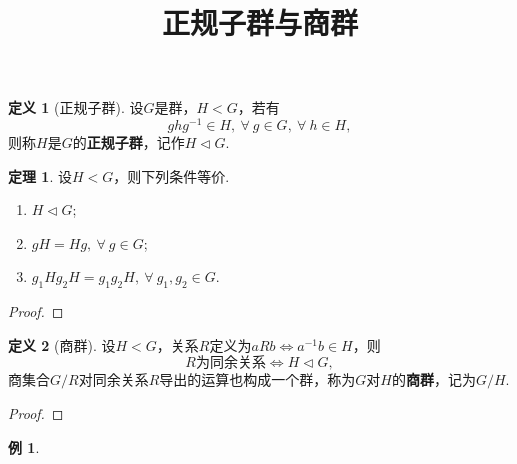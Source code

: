 \documentclass[12pt]{ctexart}
\title{\vspace{-2em}\textbf{正规子群与商群}\vspace{-2em}}
\date{ }
\theoremstyle{definition}
\newtheorem{definition}{定义}
\newtheorem{theorem}{定理}
\newtheorem{example}{例}
\theoremstyle{plain}
\begin{document}
	\maketitle
	\begin{definition}[正规子群]
		设$G$是群，$H<G$，若有
		$$ghg^{-1}\in H,\ \forall\ g\in G,\ \forall\ h\in H,$$
		则称$H$是$G$的\textbf{正规子群}，记作$H\vartriangleleft G$.
	\end{definition}
	\begin{theorem}
		设$H<G$，则下列条件等价.
		\begin{enumerate}
			\item $H\vartriangleleft G$;
			\item $gH=Hg,\ \forall\ g\in G$;
			\item $g_1Hg_2H=g_1g_2H,\ \forall\ g_1,g_2\in G$.
		\end{enumerate}
	\end{theorem}
	\begin{proof}
		
	\end{proof}
	\begin{definition}[商群]
		设$H<G$，关系$R$定义为$aRb\iff a^{-1}b\in H$，则
		$$R\text{为同余关系}\iff H\vartriangleleft G,$$
		商集合$G/R$对同余关系$R$导出的运算也构成一个群，称为$G$对$H$的\textbf{商群}，记为$G/H$.
	\end{definition}
	\begin{proof}
		
	\end{proof}
	\begin{example}
		
	\end{example}
\end{document}
